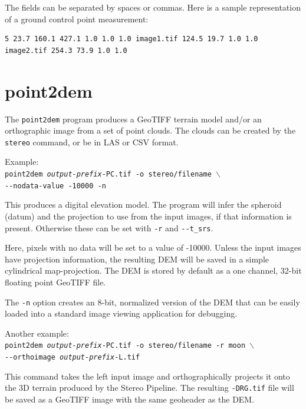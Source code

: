 The fields can be separated by spaces or commas. Here is a sample representation
of a ground control point measurement:

\begin{verbatim}
5 23.7 160.1 427.1 1.0 1.0 1.0 image1.tif 124.5 19.7 1.0 1.0 image2.tif 254.3 73.9 1.0 1.0
\end{verbatim}

\section{point2dem}
\label{point2dem}

The \texttt{point2dem} program produces a GeoTIFF terrain model and/or
an orthographic image from a set of point clouds. The clouds can be
created by the {\tt stereo} command, or be in LAS or CSV format.

Example:\\
\hspace*{2em}\texttt{point2dem \textit{output-prefix}-PC.tif -o stereo/filename $\backslash$} \\
\hspace*{4em}\texttt{-\/-nodata-value -10000 -n}

This produces a digital elevation model. The program will infer the
spheroid (datum) and the projection to use from the input images, if that
information is present. Otherwise these can be set with \texttt{-r} and \texttt{-\/-t\_srs}.

Here, pixels with no data will be set to a value of -10000. Unless the input
images have projection information, the resulting \ac{DEM} will be saved
in a simple cylindrical map-projection.  The \ac{DEM} is
stored by default as a one channel, 32-bit floating point GeoTIFF file.

The {\tt -n} option creates an 8-bit, normalized version of the DEM
that can be easily loaded into a standard image viewing application
for debugging.

Another example: \\
\hspace*{2em}\texttt{point2dem \textit{output-prefix}-PC.tif -o stereo/filename -r moon $\backslash$} \\
\hspace*{4em}\texttt{-\/-orthoimage \textit{output-prefix}-L.tif}

This command takes the left input image and orthographically projects
it onto the 3D terrain produced by the Stereo Pipeline.  The resulting
{\tt *-DRG.tif} file will be saved as a GeoTIFF image with the same
geoheader as the DEM.

